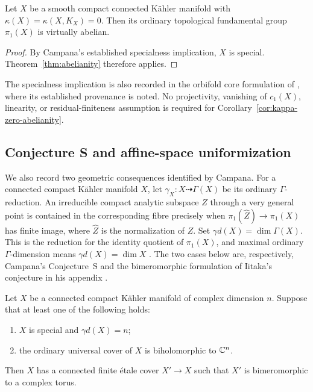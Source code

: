 \begin{corollary}
\label{cor:kappa-zero-abelianity}
Let \(X\) be a smooth compact connected K\"ahler manifold with
\(\kappa(X)=\kappa(X,K_X)=0\). Then its ordinary topological fundamental
group \(\pi_1(X)\) is virtually abelian.
\end{corollary}

\begin{proof}
By Campana's established specialness implication, \(X\) is special.
Theorem~\ref{thm:abelianity} therefore applies.
\end{proof}

The specialness implication is also recorded in the orbifold core
formulation of \cite[Corollary \emph{Kodaira dimension along the core}]{OpenAIIitaka2026},
where its established provenance is noted. No projectivity,
vanishing of \(c_1(X)\), linearity, or residual-finiteness assumption
is required for Corollary~\ref{cor:kappa-zero-abelianity}.

\subsection{Conjecture S and affine-space uniformization}

We also record two geometric consequences identified by Campana.
For a connected compact K\"ahler manifold \(X\), let
\(\gamma_X:X\dashrightarrow\Gamma(X)\) be its ordinary
\(\Gamma\)-reduction. An irreducible compact analytic subspace \(Z\)
through a very general point is contained in the corresponding fibre
precisely when \(\pi_1(\widehat Z)\to\pi_1(X)\) has finite image,
where \(\widehat Z\) is the normalization of \(Z\). Set
\(\gamma d(X)=\dim\Gamma(X)\). This is the reduction for the identity
quotient of \(\pi_1(X)\), and maximal ordinary \(\Gamma\)-dimension
means \(\gamma d(X)=\dim X\)
\cite[Definition~2.2 and the paragraph preceding Conjecture~A.3]{ClaudonHoring2013}.
The two cases below are, respectively, Campana's Conjecture~S and the
bimeromorphic formulation of Iitaka's conjecture in his appendix
\cite[Conjecture~A.3 and Remark~A.4(2)]{ClaudonHoring2013}.

\begin{corollary}
\label{cor:conjecture-s-iitaka}
Let \(X\) be a connected compact K\"ahler manifold of complex dimension
\(n\). Suppose that at least one of the following holds:
\begin{enumerate}[label=\textup{(\roman*)}]
\item \(X\) is special and \(\gamma d(X)=n\);
\item the ordinary universal cover of \(X\) is biholomorphic to \(\mathbb C^n\).
\end{enumerate}
Then \(X\) has a connected finite \'etale cover \(X'\to X\) such that
\(X'\) is bimeromorphic to a complex torus.
\end{corollary}

